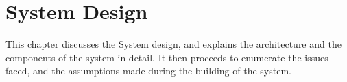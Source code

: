\chapter{System Design}
This chapter discusses the System design, and explains the architecture and the components of the system in detail. It then proceeds to enumerate the issues faced, and the assumptions made during the building of the system. 







